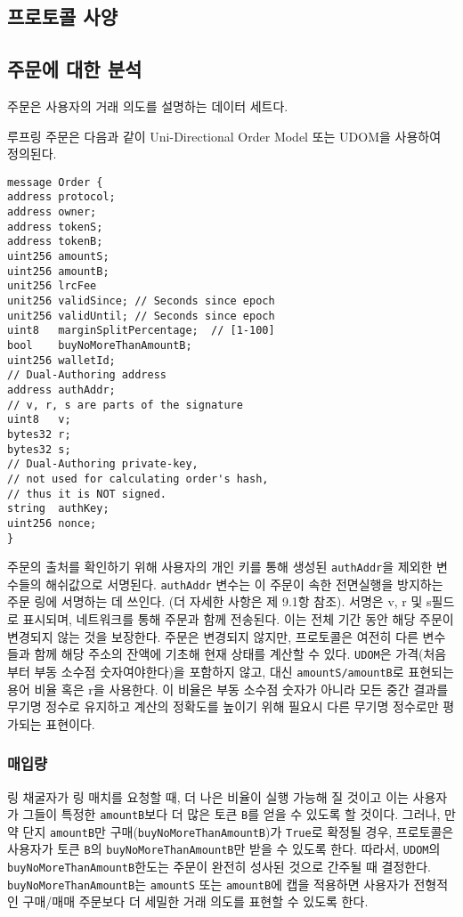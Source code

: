 \documentclass{article}
\begin{document}
\begin{multicols}{2}
\section{프로토콜 사양\label{sec:protocol}}

\subsection{주문에 대한 분석\label{anatomy}}

주문은 사용자의 거래 의도를 설명하는 데이터 세트다. 

루프링 주문은 다음과 같이 Uni-Directional Order Model 또는 UDOM을 사용하여 정의된다.


\begin{verbatim}
message Order {
address protocol;
address owner;
address tokenS;
address tokenB;
uint256 amountS;
uint256 amountB;
unit256 lrcFee
unit256 validSince; // Seconds since epoch
unit256 validUntil; // Seconds since epoch
uint8   marginSplitPercentage;  // [1-100]
bool    buyNoMoreThanAmountB;
uint256 walletId;
// Dual-Authoring address
address authAddr;
// v, r, s are parts of the signature
uint8   v;       
bytes32 r;
bytes32 s;
// Dual-Authoring private-key,
// not used for calculating order's hash,
// thus it is NOT signed.
string  authKey;          
uint256 nonce;
}
\end{verbatim}


주문의 출처를 확인하기 위해 사용자의 개인 키를 통해 생성된 \verb|authAddr|을 제외한 변수들의 해쉬값으로 서명된다. \verb|authAddr| 변수는 이 주문이 속한 전면실행을 방지하는 주문 링에 서명하는 데 쓰인다. (더 자세한 사항은 제 9.1항 참조). 서명은 v, r 및 s필드로 표시되며, 네트워크를 통해 주문과 함께 전송된다. 이는 전체 기간 동안 해당 주문이 변경되지 않는 것을 보장한다. 주문은 변경되지 않지만, 프로토콜은 여전히 다른 변수들과 함께 해당 주소의 잔액에 기초해 현재 상태를 계산할 수 있다.
\verb|UDOM|은 가격(처음부터 부동 소수점 숫자여야한다)을 포함하지 않고, 대신 \verb|amountS/amountB|로 표현되는 용어 비율 혹은 r을 사용한다. 이 비율은 부동 소수점 숫자가 아니라 모든 중간 결과를 무기명 정수로 유지하고 계산의 정확도를 높이기 위해 필요시 다른 무기명 정수로만 평가되는 표현이다.


\subsubsection{매입량}

링 채굴자가 링 매치를 요청할 때, 더 나은 비율이 실행 가능해 질 것이고 이는 사용자가 그들이 특정한 \verb|amountB|보다 더 많은 토큰 \verb|B|를 얻을 수 있도록 할 것이다. 그러나, 만약 단지 \verb|amountB|만 구매(\verb|buyNoMoreThanAmountB|)가 \verb|True|로 확정될 경우, 프로토콜은 사용자가 토큰 \verb|B|의 \verb|buyNoMoreThanAmountB|만 받을 수 있도록 한다. 따라서, \verb|UDOM|의 \verb|buyNoMoreThanAmountB|한도는 주문이 완전히 성사된 것으로 간주될 때 결정한다. \verb|buyNoMoreThanAmountB|는 \verb|amountS| 또는 \verb|amountB|에 캡을 적용하면 사용자가 전형적인 구매/매매 주문보다 더 세밀한 거래 의도를 표현할 수 있도록 한다.


\end{multicols}
\end{document}
